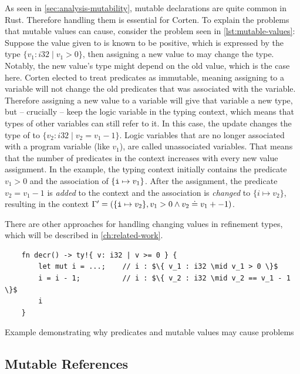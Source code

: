\documentclass[twoside, english]{sdqthesis}
\theoremstyle{definition}
\begin{document}
As seen in \cref{sec:analysis-mutability}, mutable declarations are quite common in Rust. Therefore handling them is essential for Corten.
To explain the problems that mutable values can cause, consider the problem seen in \cref{lst:mutable-values}: Suppose the value given to  is known to be positive, which is expressed by the type $\{ v_1 : i32 \mid v_1 > 0\}$, then assigning a new value to  may change the type. Notably, the new value's type might depend on the old value, which is the case here.
Corten elected to treat predicates as immutable, meaning assigning to a variable will not change the old predicates that was associated with the variable.
Therefore assigning a new value to a variable will give that variable a new type, but -- crucially -- keep the logic variable in the typing context, which means that types of other variables can still refer to it. In this case, the update  changes the type of  to $\{ v_2 : i32 \mid v_2 = v_1 - 1\}$.
Logic variables that are no longer associated with a program variable (like $v_1$), are called unassociated variables.
That means that the number of predicates in the context increases with every new value assignment.
In the example, the typing context initially contains the predicate $v_1 > 0$ and the association of $\{\code{i} \mapsto v_1\}$. After the assignment, the predicate $v_2 = v_1 - 1$ is \textit{added} to the context and the association is \textit{changed} to $\{i \mapsto v_2\}$, resulting in the context $\Gamma' = (\{\code{i} \mapsto v_2\}, v_1 > 0 \wedge v_2 \doteq v_1 +-1)$.

There are other approaches for handling changing values in refinement types, which will be described in \ref{ch:related-work}.


\begin{listing}[h]
  \begin{verbatim}
    fn decr() -> ty!{ v: i32 | v >= 0 } {
        let mut i = ...;    // i : $\{ v_1 : i32 \mid v_1 > 0 \}$
        i = i - 1;          // i : $\{ v_2 : i32 \mid v_2 == v_1 - 1 \}$
        i
    }
  \end{verbatim}
  \caption{Example demonstrating why predicates and mutable values may cause problems}
  \label{lst:mutable-values}
\end{listing}

\subsection{Mutable References}\label{subsec:mutable-references}
\end{document}

